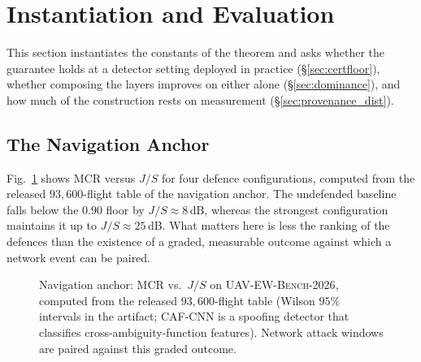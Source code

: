 \documentclass[conference,letterpaper,10pt]{IEEEtran}   %
\newcommand{\dataset}[1]{\textsc{#1}}
\begin{document}
\section{Instantiation and Evaluation}
\label{sec:eval}
This section instantiates the constants of the theorem and asks whether the
guarantee holds at a detector setting deployed in practice
(\S\ref{sec:certfloor}), whether composing the layers improves on either alone
(\S\ref{sec:dominance}), and how much of the construction rests on measurement
(\S\ref{sec:provenance_dist}).

\subsection{The Navigation Anchor}
Fig.~\ref{fig:mcr} shows MCR versus $J/S$ for four defence configurations,
computed from the released $93{,}600$-flight table of the navigation anchor.
The undefended baseline falls below the $0.90$ floor by $J/S\!\approx\!8$\,dB,
whereas the strongest configuration maintains it up to $J/S\!\approx\!25$\,dB.
What matters here is less the ranking of the defences than the existence of a
graded, measurable outcome against which a network event can be paired.

\begin{figure}[t]
\centering
{}
\caption{Navigation anchor: MCR vs.\ $J/S$ on \dataset{UAV-EW-Bench-2026},
computed from the released $93{,}600$-flight table (Wilson $95\%$ intervals in
the artifact; CAF-CNN is a spoofing detector that classifies cross-ambiguity-function
features). Network attack windows are paired against this graded outcome.}
\label{fig:mcr}
\end{figure}
\end{document}
